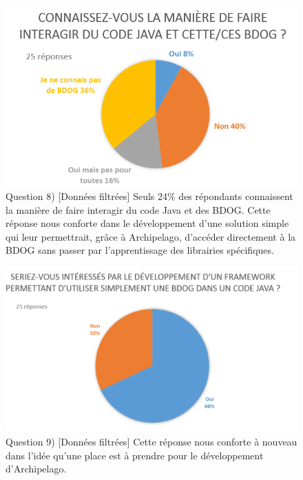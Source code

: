 \documentclass[a4paper,fleqn,12pt,oneside]{book}
\begin{document}
\begin{figure}[!ht]
\centering
\includegraphics[scale=1]{figures/QLibJavaFilt.png}
\caption{Question 8) [Données filtrées] Seuls 24\% des répondants connaissent la manière de faire interagir du code Java et des BDOG. Cette réponse nous conforte dans le développement d'une solution simple qui leur permettrait, grâce à Archipelago, d'accéder directement à la BDOG sans passer par l'apprentissage des librairies spécifiques.}
\label{fig:QLibJavaFilt}
\end{figure}

\begin{figure}[!ht]
\centering
\includegraphics[scale=0.8]{figures/QFrameworkIntFilt.png}
\caption{Question 9) [Données filtrées] Cette réponse nous conforte à nouveau dans l'idée qu'une place est à prendre pour le développement d'Archipelago.}
\label{fig:QFrameworkIntFilt}
\end{figure}

\newpage
{}
\end{document}
